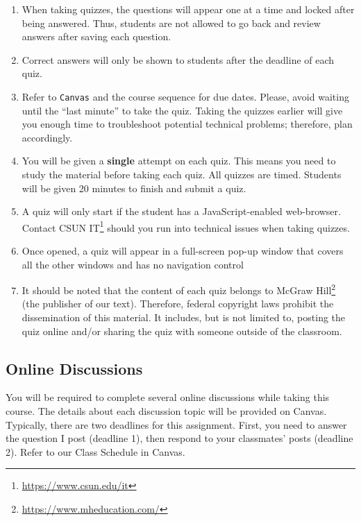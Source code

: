 \documentclass[
  letterpaper,
  DIV=11,
  numbers=noendperiod,
  oneside]{scrartcl}
\DeclareRobustCommand{\href}[2]{#2\footnote{\url{#1}}}
\begin{document}
\begin{enumerate}
\def\labelenumi{\arabic{enumi}.}
\item
  When taking quizzes, the questions will appear one at a time and
  locked after being answered. Thus, students are not allowed to go back
  and review answers after saving each question.
\item
  Correct answers will only be shown to students after the deadline of
  each quiz.
\item
  Refer to \texttt{Canvas} and the course sequence for due dates.
  Please, avoid waiting until the ``last minute'' to take the quiz.
  Taking the quizzes earlier will give you enough time to troubleshoot
  potential technical problems; therefore, plan accordingly.
\item
  You will be given a \textbf{single} attempt on each quiz. This means
  you need to study the material before taking each quiz. All quizzes
  are timed. Students will be given 20 minutes to finish and submit a
  quiz.
\item
  A quiz will only start if the student has a JavaScript-enabled
  web-browser. Contact \href{https://www.csun.edu/it}{CSUN IT} should
  you run into technical issues when taking quizzes.
\item
  Once opened, a quiz will appear in a full-screen pop-up window that
  covers all the other windows and has no navigation control
\item
  It should be noted that the content of each quiz belongs to
  \href{https://www.mheducation.com/}{McGraw Hill} (the publisher of our
  text). Therefore, federal copyright laws prohibit the dissemination of
  this material. It includes, but is not limited to, posting the quiz
  online and/or sharing the quiz with someone outside of the classroom.
\end{enumerate}

\hypertarget{online-discussions}{%
\subsection{Online Discussions}\label{online-discussions}}

You will be required to complete several online discussions while taking
this course. The details about each discussion topic will be provided on
Canvas. Typically, there are two deadlines for this assignment. First,
you need to answer the question I post (deadline 1), then respond to
your classmates' posts (deadline 2). Refer to our Class Schedule in
Canvas.
\end{document}
